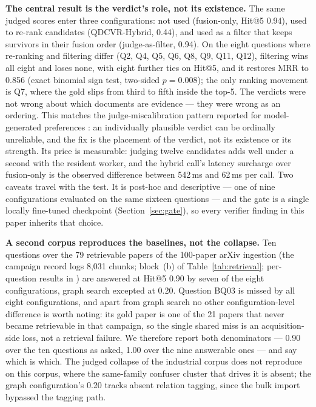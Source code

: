 \textbf{The central result is the verdict's role, not its existence.} The same
judged scores enter three configurations: not used (fusion-only, Hit@5 0.94),
used to re-rank candidates (QDCVR-Hybrid, 0.44), and used as a filter that
keeps survivors in their fusion order (judge-as-filter, 0.94). On the eight
questions where re-ranking and filtering differ (Q2, Q4, Q5, Q6, Q8, Q9, Q11,
Q12), filtering wins all eight and loses none, with eight further ties on
Hit@5, and it restores MRR to 0.856 (exact binomial sign test, two-sided
$p = 0.008$); the only ranking movement is Q7, where the gold slips from third
to fifth inside the top-5. The verdicts were not wrong about which documents
are evidence --- they were wrong as an ordering. This matches the
judge-miscalibration pattern reported for model-generated preferences
\cite{zheng-llmjudge,panickssery-selfpref}: an individually plausible verdict
can be ordinally unreliable, and the fix is the placement of the verdict, not
its existence or its strength. Its price is measurable: judging
twelve candidates adds well under a second with the resident worker, and the
hybrid call's latency surcharge over fusion-only is the observed difference
between 542\,ms and 62\,ms per call. Two caveats travel with the test. It is
post-hoc and descriptive --- one of nine configurations evaluated on the same
sixteen questions --- and the gate is a single locally fine-tuned checkpoint
(Section~\ref{sec:gate}), so every verifier finding in this paper inherits
that choice.

\textbf{A second corpus reproduces the baselines, not the collapse.} Ten
questions over the 79 retrievable papers of the 100-paper arXiv ingestion
(the campaign record logs 8{,}031 chunks; block~(b) of
Table~\ref{tab:retrieval}; per-question results in
) are answered
at Hit@5 0.90 by seven of the eight configurations, graph search excepted at
0.20. Question BQ03 is missed by all eight configurations, and apart from
graph search no other configuration-level difference is worth noting: its gold
paper is one of the 21 papers that never became
retrievable in that campaign, so the single shared miss is an acquisition-side
loss, not a retrieval failure. We therefore report both denominators --- 0.90 over
the ten questions as asked, 1.00 over the nine answerable ones --- and say
which is which. The judged collapse of the industrial corpus does not
reproduce on this corpus, where the same-family confuser cluster that drives
it is absent; the graph configuration's 0.20 tracks absent relation tagging,
since the bulk import bypassed the tagging path.

